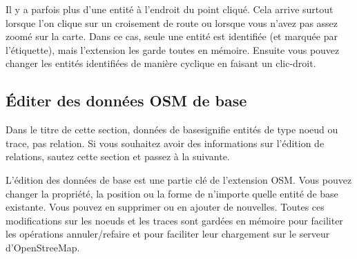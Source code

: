 Il y a parfois plus d'une entité à l'endroit du point cliqué. Cela arrive surtout lorsque l'on clique sur un croisement de route ou lorsque vous n'avez pas assez zoomé sur la carte. Dans ce cas, seule une entité est identifiée (et marquée par l'étiquette), mais l'extension les garde toutes en mémoire. Ensuite vous pouvez changer les entités identifiées de manière cyclique en faisant un clic-droit.

\subsection{Éditer des données OSM de base}

Dans le titre de cette section, \og données de base\fg signifie entités de type noeud ou trace, pas relation. Si vous souhaitez avoir des informations sur l'édition de relations, sautez cette section et passez à la suivante.
 
L'édition des données de base est une partie clé de l'extension OSM. Vous pouvez changer la propriété, la position ou la forme de n'importe quelle entité de base existante. Vous pouvez en supprimer ou en ajouter de nouvelles. Toutes ces modifications sur les noeuds et les traces sont gardées en mémoire pour faciliter les opérations annuler/refaire et pour faciliter leur chargement sur le serveur d'OpenStreeMap.


